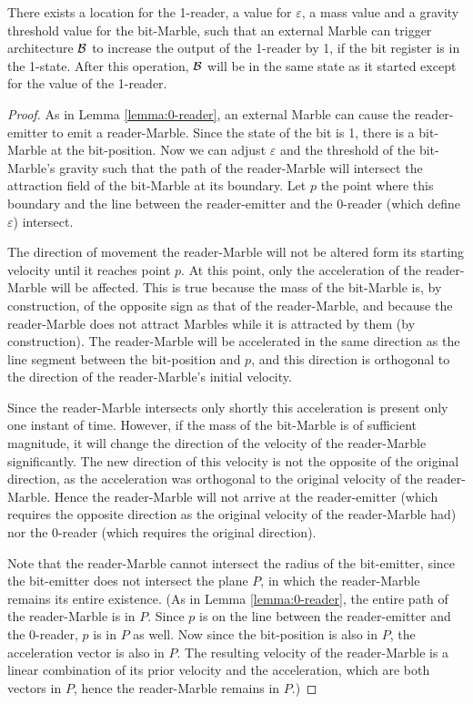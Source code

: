 \begin{lemma}
     There exists a location for the 1-reader, a value for $\varepsilon$, a mass value and a gravity threshold value for the bit-Marble, such that an external Marble can trigger architecture $\mathcal{B}$ to increase the output of the 1-reader by 1, if the bit register is in the 1-state. After this operation, $\mathcal{B}$ will be in the same state as it started except for the value of the 1-reader.
     \label{lemma:1-reader}
\end{lemma}
\begin{proof}
    As in Lemma \ref{lemma:0-reader}, an external Marble can cause the reader-emitter to emit a reader-Marble. Since the state of the bit is 1, there is a bit-Marble at the bit-position. Now we can adjust $\varepsilon$ and the threshold of the bit-Marble's gravity such that the path of the reader-Marble will intersect the attraction field of the bit-Marble at its boundary. Let $p$ the point where this boundary and the line between the reader-emitter and the 0-reader (which define $\varepsilon$) intersect. 
    
    The direction of movement the reader-Marble will not be altered form its starting velocity until it reaches point $p$. 
    At this point, only the acceleration of the reader-Marble will be affected. 
    This is true because the mass of the bit-Marble is, 
    by construction, of the opposite sign as that of the reader-Marble, 
    and because the reader-Marble does not attract Marbles while it is attracted by them (by construction).
    The reader-Marble will be accelerated in the same direction as the line segment between the bit-position and $p$, 
    and this direction is orthogonal to the direction of the reader-Marble's initial velocity. 
    
    Since the reader-Marble intersects only shortly this acceleration is present only one instant of time. 
    However, if the mass of the bit-Marble is of sufficient magnitude, 
    it will change the direction of the velocity of the reader-Marble significantly. 
    The new direction of this velocity is not the opposite of the original direction, 
    as the acceleration was orthogonal to the original velocity of the reader-Marble. 
    Hence the reader-Marble will not arrive at the reader-emitter 
    (which requires the opposite direction as the original velocity of the reader-Marble had) 
    nor the 0-reader (which requires the original direction). 
    
    Note that the reader-Marble cannot intersect the radius of the bit-emitter, 
    since the bit-emitter does not intersect the plane $P$, in which the reader-Marble remains its entire existence.
    (As in Lemma \ref{lemma:0-reader}, the entire path of the reader-Marble is in $P$. 
    Since $p$ is on the line between the reader-emitter and the 0-reader, $p$ is in $P$ as well. 
    Now since the bit-position is also in $P$, the acceleration vector is also in $P$. 
    The resulting velocity of the reader-Marble is a linear combination of its prior velocity and the acceleration, 
    which are both vectors in $P$, hence the reader-Marble remains in $P$.)
    

\end{proof}
